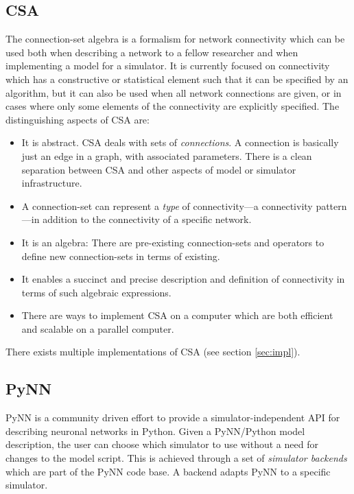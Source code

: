 \documentclass{frontiersSCNS} %
\begin{document}
\subsection{CSA}
The connection-set algebra \citep[CSA;][]{djurfeldt12} is a formalism
for network connectivity which can be used both when describing a
network to a fellow researcher and when implementing a model for a
simulator.  It is currently focused on connectivity which has a
constructive or statistical element such that it can be specified by
an algorithm, but it can also be used when all network connections are
given, or in cases where only some elements of the connectivity are
explicitly specified. The distinguishing aspects of CSA are:
\begin{itemize}
\item It is abstract. CSA deals with sets of \emph{connections}. A
  connection is basically just an edge in a graph, with associated
  parameters. There is a clean separation between CSA and other
  aspects of model or simulator infrastructure.
\item A connection-set can represent a \emph{type} of
  connectivity---a connectivity pattern---in addition to the connectivity
  of a specific network.
\item It is an algebra: There are pre-existing connection-sets and
  operators to define new connection-sets in terms of existing.
\item It enables a succinct and precise description and definition of
  connectivity in terms of such algebraic expressions.
\item There are ways to implement CSA on a computer which are both
  efficient and scalable on a parallel computer.
\end{itemize}
There exists multiple implementations of CSA (see section
\ref{sec:impl}).

\subsection{PyNN}\label{sec:pynn}

PyNN \citep[\url{http://www.neuralensemble.org/PyNN};][]{Davison09} is
a community driven effort to provide a simulator-independent API for
describing neuronal networks in Python. Given a PyNN/Python model
description, the user can choose which simulator to use without a need
for changes to the model script. This is achieved through a set of
\emph{simulator backends} which are part of the PyNN code base. A
backend adapts PyNN to a specific simulator.
\end{document}
